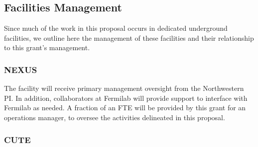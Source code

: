 %
%

\subsection{Facilities Management}
Since much of the work in this proposal occurs in dedicated underground facilities, we outline here the management of these facilities and their relationship to this grant's management.

\subsubsection{NEXUS}
The \nexus facility will receive primary management oversight from the Northwestern PI. In addition, \SuperCDMS collaborators at Fermilab will provide support to interface with Fermilab as needed. A fraction of an FTE will be provided by this grant for an operations manager, to oversee the activities delineated in this proposal. 

\subsubsection{CUTE}

